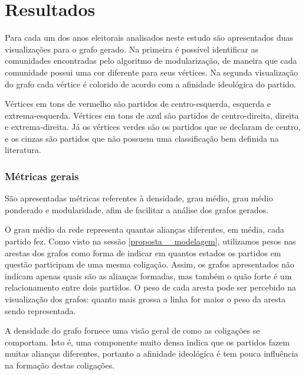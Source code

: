 \chapter{Resultados}
\label{resultados}

Para cada um dos anos eleitorais analisados neste estudo são apresentados duas visualizações para o grafo gerado. Na primeira é possível identificar as comunidades encontradas pelo algoritmo de modularização, de maneira que cada comunidade possui uma cor diferente para seus vértices. Na segunda visualização do grafo cada vértice é colorido de acordo com a afinidade ideológica do partido.

Vértices em tons de vermelho são partidos de centro-esquerda, esquerda e extrema-esquerda. Vértices em tons de azul são partidos de centro-direita, direita e extrema-direita. Já os vértices verdes são os partidos que se declaram de centro, e os cinzas são partidos que não possuem uma classificação bem definida na literatura.

\subsection{Métricas gerais}
\label{proposta__objetivos-especificos--dados-gerais}

São apresentadas métricas referentes à densidade, grau médio, grau médio ponderado e modularidade, afim de facilitar a análise dos grafos gerados.


O grau médio da rede representa quantas alianças diferentes, em média, cada partido fez. Como visto na sessão \ref{proposta__modelagem}, utilizamos pesos nas arestas dos grafos como forma de indicar em quantos estados os partidos em questão participam de uma mesma coligação. Assim, os grafos apresentados não indicam apenas quais são as alianças formadas, mas também o quão forte é um relacionamento entre dois partidos. O peso de cada aresta pode ser percebido na visualização dos grafos: quanto mais grossa a linha for maior o peso da aresta sendo representada.

A densidade do grafo fornece uma visão geral de como as coligações se comportam. Isto é, uma componente muito densa indica que os partidos fazem muitas alianças diferentes, portanto a afinidade ideológica é tem pouca influência na formação destas coligações.

